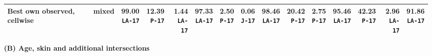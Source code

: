 \documentclass[10pt]{article}
\begin{document}
{\begin{tabular*}{\linewidth}{@{\extracolsep{\fill}}llrrrrrrrrrrrrr}
\midrule\rowcolor{blue!8} Best own observed, cellwise & mixed & \shortstack{\textbf{99.00}\\{\tiny\texttt{LA-17}}} & \shortstack{\textbf{12.39}\\{\tiny\texttt{P-17}}} & \shortstack{\textbf{1.44}\\{\tiny\texttt{LA-17}}} & \shortstack{\textbf{97.33}\\{\tiny\texttt{LA-17}}} & \shortstack{\textbf{2.50}\\{\tiny\texttt{P-17}}} & \shortstack{\textbf{0.06}\\{\tiny\texttt{J-17}}} & \shortstack{\textbf{98.46}\\{\tiny\texttt{LA-17}}} & \shortstack{\textbf{20.42}\\{\tiny\texttt{P-17}}} & \shortstack{\textbf{2.75}\\{\tiny\texttt{P-17}}} & \shortstack{\textbf{95.46}\\{\tiny\texttt{LA-17}}} & \shortstack{\textbf{42.23}\\{\tiny\texttt{P-17}}} & \shortstack{\textbf{2.96}\\{\tiny\texttt{LA-17}}} & \shortstack{\textbf{91.86}\\{\tiny\texttt{LA-17}}}\\
\bottomrule\end{tabular*}}\par
\vspace{2mm}
\textbf{(B) Age, skin and additional intersections}\par
\end{document}
